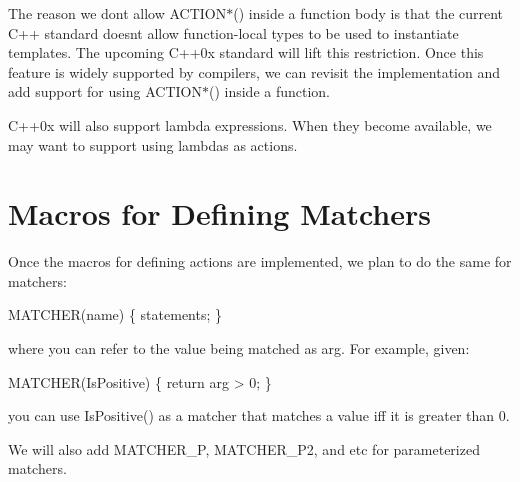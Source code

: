 The reason we don\textquotesingle{}t allow {\ttfamily A\+C\+T\+I\+O\+N$\ast$()} inside a function body is that the current C++ standard doesn\textquotesingle{}t allow function-\/local types to be used to instantiate templates. The upcoming C++0x standard will lift this restriction. Once this feature is widely supported by compilers, we can revisit the implementation and add support for using {\ttfamily A\+C\+T\+I\+O\+N$\ast$()} inside a function.

C++0x will also support lambda expressions. When they become available, we may want to support using lambdas as actions.

\section*{Macros for Defining Matchers}

Once the macros for defining actions are implemented, we plan to do the same for matchers\+:


\begin{DoxyCode}
MATCHER(name) \{ statements; \}
\end{DoxyCode}


where you can refer to the value being matched as {\ttfamily arg}. For example, given\+:


\begin{DoxyCode}
MATCHER(IsPositive) \{ \textcolor{keywordflow}{return} arg > 0; \}
\end{DoxyCode}


you can use {\ttfamily Is\+Positive()} as a matcher that matches a value iff it is greater than 0.

We will also add {\ttfamily M\+A\+T\+C\+H\+E\+R\+\_\+P}, {\ttfamily M\+A\+T\+C\+H\+E\+R\+\_\+\+P2}, and etc for parameterized matchers. 